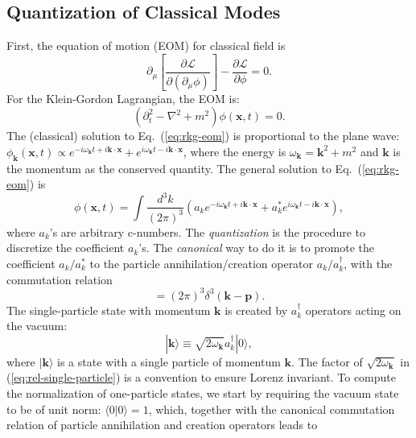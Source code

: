 \documentclass[aps,prb,superscriptaddress,nofootinbib]{revtex4}
\begin{document}
\subsection{Quantization of Classical Modes}
First, the equation of motion (EOM) for classical field is
\begin{equation}
	\partial_\mu \left[\frac{\partial \mathcal L}{\partial(\partial_\mu \phi)}\right] - \frac{\partial \mathcal L}{\partial \phi} = 0.
\end{equation}
For the Klein-Gordon Lagrangian, the EOM is:
\begin{equation}\label{eq:rkg-eom}
	(\partial_t^2-\nabla^2+m^2)\phi(\bm x,t) = 0.
\end{equation}
The (classical) solution to Eq.~(\ref{eq:rkg-eom}) is proportional to the plane wave: $\phi_{\bm k}(\bm x, t) \propto e^{-i\omega_{\bm{k}}t+i\bm{k}\cdot\bm{x}} + e^{i\omega_{\bm{k}}t-i\bm{k}\cdot\bm{x}}$, where the energy is $\omega_{\bm{k}}=\bm{k}^2+m^2$ and $\bm k$ is the momentum as the conserved quantity.
The general solution to Eq.~(\ref{eq:rkg-eom}) is
\begin{equation}
	\phi(\bm x,t) = \int \frac{d^{3} k}{(2\pi)^{3}} \left(
		a_{k}e^{-i\omega_{\bm{k}}t+i\bm{k}\cdot\bm{x}} + 
		a^*_{k}e^{i\omega_{\bm{k}}t-i\bm{k}\cdot\bm{x}} 
	\right),
\end{equation}
where $a_k$'s are arbitrary c-numbers.
The \textit{quantization} is the procedure to discretize the coefficient $a_k$'s.
The \textit{canonical} way to do it is to promote the coefficient $a_{k}/a_{k}^*$ to the particle annihilation/creation operator $a_{k}/a_{k}^\dagger$, with the commutation relation
\begin{equation}
	[a_{k}, a_{p}^\dagger] = (2\pi)^{3} \delta^{3}(\bm{k}-\bm{p}).
\end{equation}
The single-particle state with momentum $\bm k$ is created by $a_{k}^{\dagger}$ operators acting on the vacuum:
\begin{equation}
	|\bm{k}\rangle \equiv \sqrt{2\omega_{\bm k}} a_{k}^{\dagger}|0\rangle,
	\label{eq:rel-single-particle}
\end{equation}
where $|\bm{k}\rangle$ is a state with a single particle of momentum $\bm{k}$.
The factor of $\sqrt{2 \omega_{\bm k}}$ in (\ref{eq:rel-single-particle}) is a convention to ensure Lorenz invariant.
To compute the normalization of one-particle states, we start by requiring the vacuum state to be of unit norm: $\langle 0|0\rangle=1$, which, together with the canonical commutation relation of particle annihilation and creation operators leads to
\end{document}
